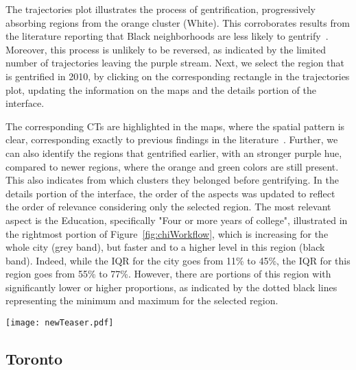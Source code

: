 The trajectories plot illustrates the process of gentrification, progressively
absorbing regions from the orange cluster (White). This corroborates results
from the literature reporting that Black neighborhoods are less likely to
gentrify~\cite{Hwang2014}. Moreover, this process is unlikely to be reversed, as
indicated by the limited number of trajectories leaving the purple stream. Next,
we select the region that is gentrified in 2010, by clicking on the
corresponding rectangle in the trajectories plot, updating the information on
the maps and the details portion of the interface.

The corresponding CTs are highlighted in the maps, where the spatial pattern is
clear, corresponding exactly to previous findings in the
literature~\cite{Hwang2014}. Further, we can also identify the regions that
gentrified earlier, with an stronger purple hue, compared to newer regions,
where the orange and green colors are still present. This also indicates from
which clusters they belonged before gentrifying. In the details portion of the
interface, the order of the aspects was updated to reflect the order of
relevance considering only the selected region. The most relevant aspect is the
Education, specifically "Four or more years of college", illustrated in the
rightmost portion of Figure~\ref{fig:chiWorkflow}, which is increasing for the
whole city (grey band), but faster and to a higher level in this region (black
band). Indeed, while the IQR for the city goes from 11\% to 45\%, the IQR for
this region goes from 55\% to 77\%. However, there are portions of this region
with significantly lower or higher proportions, as indicated by the dotted black
lines representing the minimum and maximum for the selected region.



\begin{figure*}
    \centering
 \texttt{[image: newTeaser.pdf]}
 \caption{Workflow to discover gentrification in Chicago: the purple cluster
 corresponds to high education / income. Its population is increasing over time,
 absorbing from the majority White cluster (orange). By selecting the purple
 cluster in 2010, the region is highlighted in the maps. The proportion of
 people with 4+ years of college is increasing in the whole city (grey IQRs),
 but significantly more in this region (black).\label{fig:chiWorkflow}}
\end{figure*}



\subsection{Toronto}

